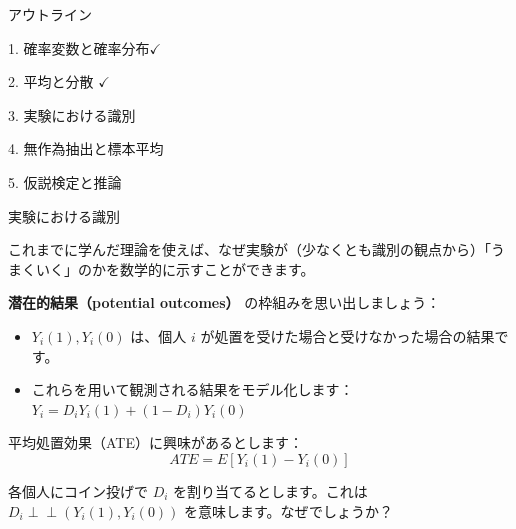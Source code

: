 \documentclass[11pt,handout]{beamer}
\newenvironment{wideitemize}{\itemize\addtolength{\itemsep}{10pt}}{\enditemize}
\newcommand{\indep}{\perp\!\!\!\!\perp}
\begin{document}
\begin{frame}{アウトライン}
	
	\textcolor{red!75!green!50!blue!25!gray}{1. 確率変数と確率分布}$\checkmark$
	\vspace{0.8cm}
	
	\textcolor{red!75!green!50!blue!25!gray}{2. 平均と分散} $\checkmark$
	\vspace{0.8cm}
	
	3. 実験における識別 
	\vspace{0.8cm}
	
	\textcolor{red!75!green!50!blue!25!gray}{4. 無作為抽出と標本平均}
	
	\vspace{0.8cm}
	\textcolor{red!75!green!50!blue!25!gray}{5. 仮説検定と推論}
	
\end{frame}

\begin{frame}{実験における識別}
\begin{wideitemize}
\item
これまでに学んだ理論を使えば、なぜ実験が（少なくとも識別の観点から）「うまくいく」のかを数学的に示すことができます。
\pause
\item \textbf{潜在的結果（potential outcomes）} の枠組みを思い出しましょう：

\begin{itemize}
	\item
	$Y_i(1), Y_i(0)$ は、個人 $i$ が処置を受けた場合と受けなかった場合の結果です。\smallskip
	
	\item
	これらを用いて観測される結果をモデル化します：$Y_i = D_i Y_i(1) + (1-D_i) Y_i(0)$ 
	
\end{itemize}

\pause
\item 
平均処置効果（ATE）に興味があるとします：
$$ATE = E[Y_i(1) - Y_i(0) ]$$

\pause
\item
各個人にコイン投げで $D_i$ を割り当てるとします。これは $D_i \indep (Y_i(1),Y_i(0))$ を意味します。なぜでしょうか？
\end{wideitemize}		
\end{frame}
\end{document}
